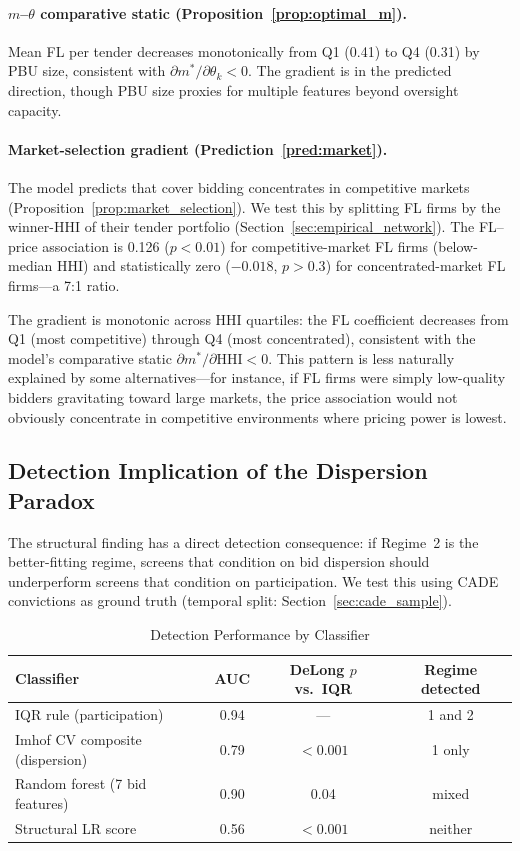 \paragraph{$m$--$\theta$ comparative static
(Proposition~\ref{prop:optimal_m}).}
Mean FL per tender decreases monotonically from Q1 (0.41) to Q4
(0.31) by PBU size, consistent with $\partial m^* / \partial
\theta_k < 0$. The gradient is in the predicted direction, though
PBU size proxies for multiple features beyond oversight capacity.

\paragraph{Market-selection gradient (Prediction~\ref{pred:market}).}
The model predicts that cover bidding concentrates in competitive
markets (Proposition~\ref{prop:market_selection}). We test this by
splitting FL firms by the winner-HHI of their tender portfolio
(Section~\ref{sec:empirical_network}). The FL--price association
is 0.126 ($p < 0.01$) for competitive-market FL firms (below-median
HHI) and statistically zero ($-0.018$, $p > 0.3$) for
concentrated-market FL firms---a 7:1 ratio.

The gradient is monotonic across HHI quartiles: the FL coefficient
decreases from Q1 (most competitive) through Q4 (most concentrated),
consistent with the model's comparative static
$\partial m^* / \partial \text{HHI} < 0$. This pattern is less naturally explained by some alternatives---for
instance, if FL firms were simply low-quality bidders gravitating
toward large markets, the price association would not obviously
concentrate in competitive environments where
pricing power is lowest.


\subsection{Detection Implication of the Dispersion Paradox}
\label{sec:results_detection}

The structural finding has a direct detection consequence: if
Regime~2 is the better-fitting regime, screens that condition on bid dispersion should
underperform screens that condition on participation. We test this
using CADE convictions as ground truth (temporal split:
Section~\ref{sec:cade_sample}).

\begin{table}[!htbp]
\centering
\caption{Detection Performance by Classifier}
\label{tab:detection_auc}
\small
\begin{tabular}{lccc}
\toprule
Classifier & AUC & DeLong $p$ vs.\ IQR & Regime detected \\
\midrule
IQR rule (participation) & 0.94 & --- & 1 and 2 \\
Imhof CV composite (dispersion) & 0.79 & $< 0.001$ & 1 only \\
Random forest (7 bid features) & 0.90 & 0.04 & mixed \\
Structural LR score & 0.56 & $< 0.001$ & neither \\
\bottomrule
\end{tabular}
\end{table}

